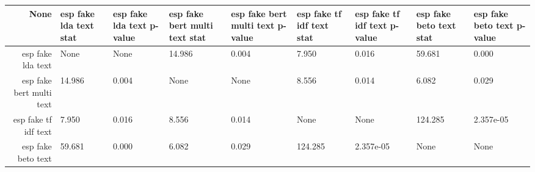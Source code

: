 \begin{tabular}{|r|l|l|l|l|l|l|l|l|}
  \hline
  None & esp fake lda text stat & esp fake lda text p-value & esp fake bert multi text stat & esp fake bert multi text p-value & esp fake tf idf text stat & esp fake tf idf text p-value & esp fake beto text stat & esp fake beto text p-value \\ 
  \hline
  esp fake lda text & None & None & 14.986 & 0.004 & 7.950 & 0.016 & 59.681 & 0.000 \\ 
  \hline
  esp fake bert multi text & 14.986 & 0.004 & None & None & 8.556 & 0.014 & 6.082 & 0.029 \\ 
  \hline
  esp fake tf idf text & 7.950 & 0.016 & 8.556 & 0.014 & None & None & 124.285 & 2.357e-05 \\ 
  \hline
  esp fake beto text & 59.681 & 0.000 & 6.082 & 0.029 & 124.285 & 2.357e-05 & None & None \\ 
  \hline
\end{tabular}
